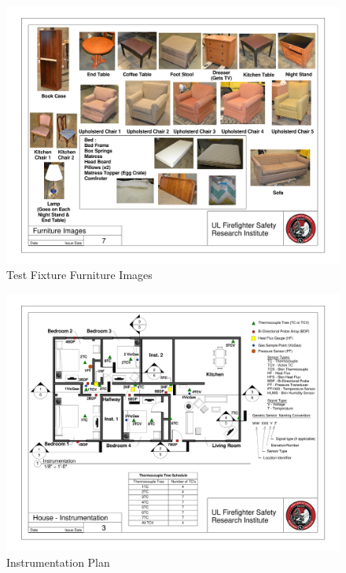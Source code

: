 \documentclass[12pt,oneside]{book}
\begin{document}
\begin{appendices}
\begin{figure}
\includegraphics[width=\textheight]{../0_Images/Appendix_Figures/Furniture_Images}
\caption[]{Test Fixture Furniture Images}
\label{fig:appendix_furnitureimages}
\end{figure}

\begin{figure}
\includegraphics[width=\textheight]{../0_Images/Appendix_Figures/Instrument_Plan}
\caption[]{Instrumentation Plan}
\label{fig:appendix_instruments}
\end{figure}


\end{appendices}
\end{document}
